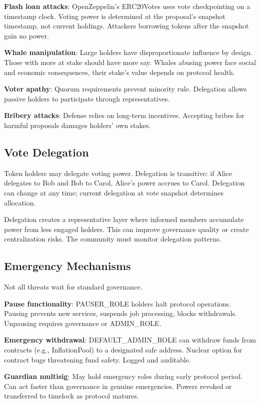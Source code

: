 \documentclass[11pt,a4paper]{article}
\begin{document}
\textbf{Flash loan attacks}: OpenZeppelin's ERC20Votes uses vote checkpointing on a timestamp clock. Voting power is determined at the proposal's snapshot timestamp, not current holdings. Attackers borrowing tokens after the snapshot gain no power.

\textbf{Whale manipulation}: Large holders have disproportionate influence by design. Those with more at stake should have more say. Whales abusing power face social and economic consequences, their stake's value depends on protocol health.

\textbf{Voter apathy}: Quorum requirements prevent minority rule. Delegation allows passive holders to participate through representatives.

\textbf{Bribery attacks}: Defense relies on long-term incentives. Accepting bribes for harmful proposals damages holders' own stakes.

\subsection{Vote Delegation}

Token holders may delegate voting power. Delegation is transitive: if Alice delegates to Bob and Bob to Carol, Alice's power accrues to Carol. Delegation can change at any time; current delegation at vote snapshot determines allocation.

Delegation creates a representative layer where informed members accumulate power from less engaged holders. This can improve governance quality or create centralization risks. The community must monitor delegation patterns.

\subsection{Emergency Mechanisms}

Not all threats wait for standard governance.

\textbf{Pause functionality}: PAUSER\_ROLE holders halt protocol operations. Pausing prevents new services, suspends job processing, blocks withdrawals. Unpausing requires governance or ADMIN\_ROLE.

\textbf{Emergency withdrawal}: DEFAULT\_ADMIN\_ROLE can withdraw funds from contracts (e.g., InflationPool) to a designated safe address. Nuclear option for contract bugs threatening fund safety. Logged and auditable.

\textbf{Guardian multisig}: May hold emergency roles during early protocol period. Can act faster than governance in genuine emergencies. Powers revoked or transferred to timelock as protocol matures.
\end{document}

